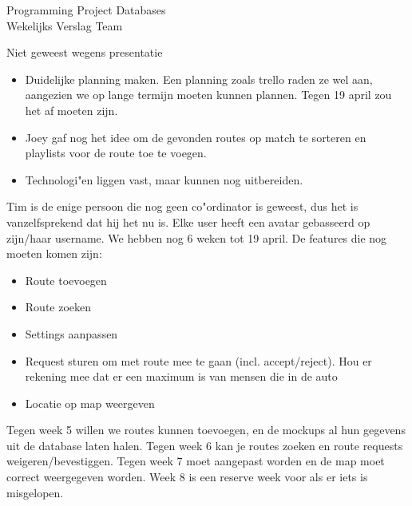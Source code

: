 \documentclass{article}
\newcounter{team}
\begin{document}

	\begin{Minutes}{Programming Project Databases \\ Wekelijks Verslag Team }
		\missingNoExcuse{/}
		\missingExcused{/}

		\maketitle

		Niet geweest wegens presentatie

		\begin{itemize}
		    \item Duidelijke planning maken. Een planning zoals trello raden ze wel aan, aangezien we op lange termijn moeten kunnen plannen. Tegen 19 april zou het af moeten zijn.
		    \item Joey gaf nog het idee om de gevonden routes op match te sorteren en playlists voor de route toe te voegen.
		    \item Technologi"en liggen vast, maar kunnen nog uitbereiden.
		\end{itemize}






				    Tim is de enige persoon die nog geen co"ordinator is geweest, dus het is vanzelfsprekend dat hij het nu is.
			        Elke user heeft een avatar gebasseerd op zijn/haar username.
			        We hebben nog 6 weken tot 19 april.
			        De features die nog moeten komen zijn:
			        \begin{itemize}
			            \item Route toevoegen
			            \item Route zoeken
			            \item Settings aanpassen
			            \item Request sturen om met route mee te gaan (incl. accept/reject). Hou er rekening mee dat er een maximum is van mensen die in de auto
			            \item Locatie op map weergeven
			        \end{itemize}
			        Tegen week 5 willen we routes kunnen toevoegen, en de mockups al hun gegevens uit de database laten halen.
			        Tegen week 6 kan je routes zoeken en route requests weigeren/bevestiggen.
			        Tegen week 7 moet aangepast worden en de map moet correct weergegeven worden.
			        Week 8 is een reserve week voor als er iets is misgelopen.


\end{Minutes}
\end{document}
